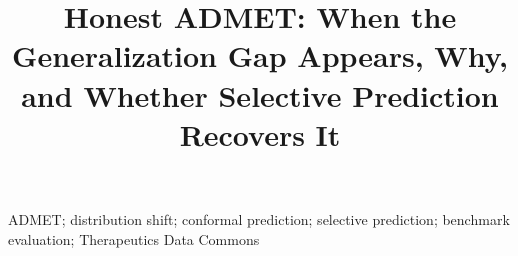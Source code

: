 \documentclass[pmlr]{jmlr}
\title[Honest ADMET]{Honest ADMET: When the Generalization Gap Appears, Why, and Whether Selective Prediction Recovers It}
\author{\Name{Anonymous Author(s)} \Email{anonymous@ml4h.cc}}
\begin{document}
\maketitle
\begin{abstract}

\end{abstract}
\begin{keywords}
ADMET; distribution shift; conformal prediction; selective prediction; benchmark evaluation; Therapeutics Data Commons
\end{keywords}

\end{document}
